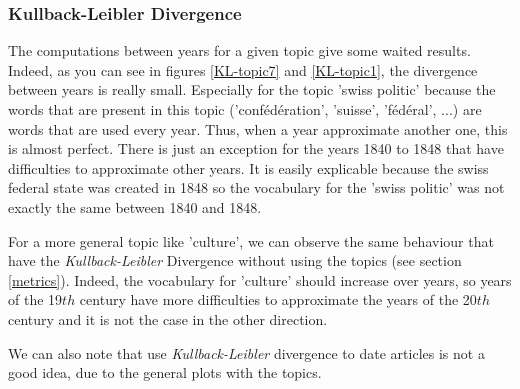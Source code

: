 \subsubsection{Kullback-Leibler Divergence}

The computations between years for a given topic give some waited results. Indeed, as you can see in figures \ref{KL-topic7} and \ref{KL-topic1}, the divergence between years is really small. Especially for the topic 'swiss politic' because the words that are present in this topic ('confédération', 'suisse', 'fédéral', ...) are words that are used every year. Thus, when a year approximate another one, this is almost perfect. There is just an exception for the years 1840 to 1848 that have difficulties to approximate other years. It is easily explicable because the swiss federal state was created in 1848 so the vocabulary for the 'swiss politic' was not exactly the same between 1840 and 1848.

For a more general topic like 'culture', we can observe the same behaviour that have the \emph{Kullback-Leibler} Divergence without using the topics (see section \ref{metrics}). Indeed, the vocabulary for 'culture' should increase over years, so years of the 19$th$ century have more difficulties to approximate the years of the 20$th$ century and it is not the case in the other direction.

We can also note that use \emph{Kullback-Leibler} divergence to date articles is not a good idea, due to the general plots with the topics.


